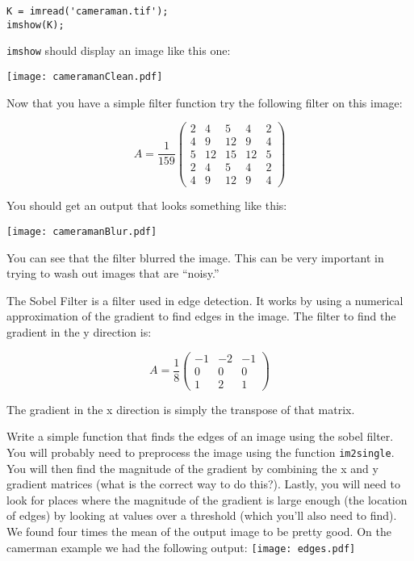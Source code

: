 \begin{verbatim}
K = imread('cameraman.tif');
imshow(K);
\end{verbatim}

{\tt imshow} should display an image like this one:

\texttt{[image: cameramanClean.pdf]}

Now that you have a simple filter function try the following filter on this image:

\[
A = \frac{1}{159}\begin{pmatrix}
2&4&5&4&2\\
4&9&12&9&4\\
5&12&15&12&5\\
2&4&5&4&2\\
4&9&12&9&4
\end{pmatrix}
\]

You should get an output that looks something like this:

\texttt{[image: cameramanBlur.pdf]}

You can see that the filter blurred the image. This can be very important in trying to wash out images that are ``noisy.''

\begin{problem}

The Sobel Filter is a filter used in edge detection. It works by using a numerical approximation of the gradient to find edges in the image. The filter to find the gradient in the y direction is:

\[
A = \frac{1}{8}\begin{pmatrix}
-1&-2&-1\\
0&0&0\\
1&2&1
\end{pmatrix}
\]

The gradient in the x direction is simply the transpose of that matrix.

Write a simple function that finds the edges of an image using the sobel filter. You will probably need to preprocess the image using the function {\tt im2single}. You will then find the magnitude of the gradient by combining the x and y gradient matrices (what is the correct way to do this?). Lastly, you will need to look for places where the magnitude of the gradient is large enough (the location of edges) by looking at values over a threshold (which you'll also need to find). We found four times the mean of the output image to be pretty good. On the camerman example we had the following output:
\texttt{[image: edges.pdf]}
\end{problem}
